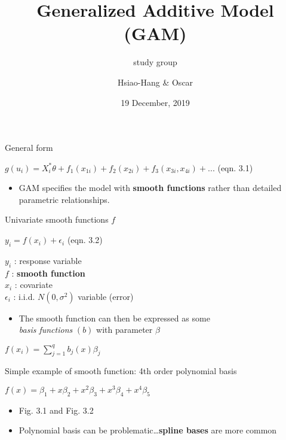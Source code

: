 \documentclass[14 pt,ignorenonframetext,]{beamer}
\title{Generalized Additive Model (GAM)}
\subtitle{study group}
\author{Hsiao-Hang \& Oscar}
\institute{Institute of Oceanography, National Taiwan University}
\date{19 December, 2019}
\providecommand{\tightlist}{%
  \setlength{\itemsep}{0pt}\setlength{\parskip}{0pt}}
\begin{document}
\frame{\titlepage}

\begin{frame}{General form}
\protect\hypertarget{general-form}{}

\(g(u_i) = X^*_i \theta + f_1(x_{1i}) + f_2(x_{2i}) + f_3(x_{3i}, x_{4i}) + ...\)
(eqn. 3.1)

\begin{itemize}
\tightlist
\item
  GAM specifies the model with \textbf{smooth functions} rather than
  detailed parametric relationships.
\end{itemize}

\end{frame}

\begin{frame}{Univariate smooth functions \(f\)}
\protect\hypertarget{univariate-smooth-functions-f}{}

\(y_i = f(x_i) + \epsilon_i\) (eqn. 3.2)

\(y_i\) : response variable\\
\(f\) : \textbf{smooth function}\\
\(x_i\) : covariate\\
\(\epsilon_i\) : i.i.d. \(N(0, \sigma^2)\) variable (error)\\

\begin{itemize}
\tightlist
\item
  The smooth function can then be expressed as some\\
  \emph{basis functions} \((b)\) with parameter \(\beta\)
\end{itemize}

\(f(x_i) = \sum_{j=1}^{q} b_j(x)\beta_j\)

\end{frame}

\begin{frame}{Simple example of smooth function: 4th order polynomial
basis}
\protect\hypertarget{simple-example-of-smooth-function-4th-order-polynomial-basis}{}

\(f(x) = \beta_1 + x\beta_2 + x^2\beta_3 + x^3\beta_4 + x^4\beta_5\)

\begin{itemize}
\item
  Fig. 3.1 and Fig. 3.2
\item
  Polynomial basis can be problematic\ldots{}\textbf{spline bases} are
  more common
\end{itemize}

\end{frame}
\end{document}
